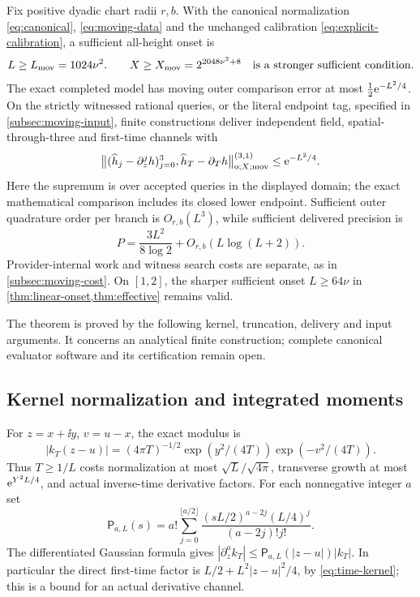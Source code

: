 \begin{theorem}
\label{thm:moving-endpoint-delivery}
Fix positive dyadic chart radii \(r,b\). With the canonical normalization
\eqref{eq:canonical}, \eqref{eq:moving-data} and the unchanged calibration
\eqref{eq:explicit-calibration}, a sufficient all-height onset is
\begin{equation}
 L\ge L_{\mathrm{mov}}=1024\nu^2.
 \qquad X\ge X_{\mathrm{mov}}=2^{2048\nu^2+8}
 \quad\hbox{is a stronger sufficient condition}.
 \label{eq:moving-onset}
\end{equation}
The exact completed model has moving outer comparison error
at most \(\tfrac12\mathrm e^{-L^2/4}\). On the strictly witnessed rational
queries, or the literal endpoint tag, specified in
\cref{subsec:moving-input}, finite constructions deliver independent
field, spatial-through-three and first-time channels with
\begin{equation}
 \bigl\lVert
   (\widehat h_j-\partial_z^jh)_{j=0}^3,
                  \widehat h_T-\partial_Th
 \bigr\rVert_{\mathrm o;X;\mathrm{mov}}^{(3,1)}
 \le\mathrm e^{-L^2/4}.
 \label{eq:moving-delivery}
\end{equation}
Here the supremum is over accepted queries in the displayed domain;
the exact mathematical comparison includes its closed lower endpoint.
Sufficient outer quadrature order per branch is \(O_{r,b}(L^3)\), while
sufficient delivered precision is
\begin{equation}
 P=\frac{3L^2}{8\log2}+O_{r,b}(L\log(L+2)).
 \label{eq:moving-precision}
\end{equation}
Provider-internal work and witness search costs are separate, as in
\cref{subsec:moving-cost}. On \([1,2]\), the sharper sufficient onset
\(L\ge64\nu\) in \cref{thm:linear-onset,thm:effective} remains valid.
\end{theorem}
The theorem is proved by the following kernel, truncation, delivery and
input arguments. It concerns an analytical finite construction; complete
canonical evaluator software and its certification remain open.

\subsection{Kernel normalization and integrated moments}
\label{subsec:moving-moments}
For \(z=x+\ii y\), \(v=u-x\), the exact modulus is
\begin{equation}
 |k_T(z-u)|=(4\pi T)^{-1/2}
       \exp(y^2/(4T))\exp(-v^2/(4T)).
 \label{eq:moving-kernel}
\end{equation}
Thus \(T\ge1/L\) costs normalization at most
\(\sqrt L/\sqrt{4\pi}\), transverse growth at most
\(\mathrm e^{Y^2L/4}\), and actual inverse-time derivative factors.
For each nonnegative integer \(a\) set
\begin{equation}
 \mathsf P_{a,L}(s)=a!\sum_{j=0}^{\lfloor a/2\rfloor}
       \frac{(sL/2)^{a-2j}(L/4)^j}{(a-2j)!j!}.
 \label{eq:moving-kernel-polynomial}
\end{equation}
The differentiated Gaussian formula gives
\(|\partial_z^ak_T|\le\mathsf P_{a,L}(|z-u|)|k_T|\).
In particular the direct first-time factor is
\(L/2+L^2|z-u|^2/4\), by \eqref{eq:time-kernel}; this is a bound for
an actual derivative channel.

